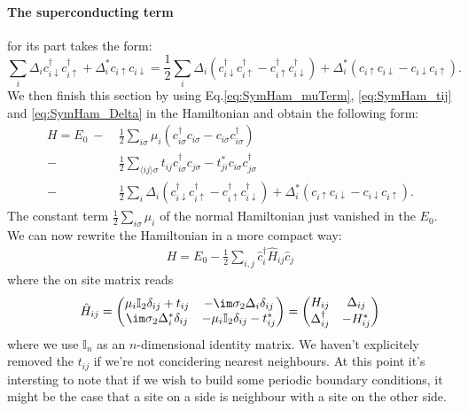 \documentclass[../main.tex]{subfile}
\begin{document}
\paragraph{The superconducting term} for its part takes the form:
\begin{equation}\label{eq:SymHam_Delta}
\sum_{i} \Delta_i c_{i\downarrow}^{\dagger}c_{i\uparrow}^{\dagger} + \Delta_i^{\ast} c_{i\uparrow}c_{i\downarrow}
        = \frac{1}{2}\sum_{i} \Delta_i \left(c_{i\downarrow}^{\dagger}c_{i\uparrow}^{\dagger}-c_{i\uparrow}^{\dagger}c_{i\downarrow}^{\dagger}\right)+ \Delta_i^{\ast} \left(c_{i\uparrow}c_{i\downarrow}-c_{i\downarrow}c_{i\uparrow}\right).
\end{equation}
We then finish this section by using Eq.\ref{eq:SymHam_muTerm}, \ref{eq:SymHam_tij} and \ref{eq:SymHam_Delta} in the Hamiltonian and obtain the following form:
\begin{equation}\label{eq:Ham_Symm_Supercond_1}
    \begin{aligned}
    H = E_0 ~-~& \frac{1}{2} \sum_{i\sigma} \mu_i\left(c_{i\sigma}^{\dagger}c_{i\sigma} - c_{i\sigma}c_{i\sigma}^{\dagger}\right)\\
    -& \frac{1}{2}\sum_{\langle ij\rangle \sigma} t_{ij}c_{i\sigma}^{\dagger}c_{j\sigma} - t_{ji}^{\ast}c_{i\sigma}c_{j\sigma}^{\dagger}\\
    -& \frac{1}{2}\sum_{i} \Delta_i \left(c_{i\downarrow}^{\dagger}c_{i\uparrow}^{\dagger}-c_{i\uparrow}^{\dagger}c_{i\downarrow}^{\dagger}\right) +
    \Delta_i^{\ast} \left(c_{i\uparrow}c_{i\downarrow}-c_{i\downarrow}c_{i\uparrow}\right).
    \end{aligned}
\end{equation}
The constant term $\frac{1}{2} \sum_{i\sigma} \mu_i$ of the normal Hamiltonian just vanished in the $E_0$. 
We can now rewrite the Hamiltonian in a more compact way:
\begin{align}
    H = E_0 - \frac{1}{2}\sum_{i,j} \hat{c}_i^{\dagger} \hat{H}_{ij} \hat{c}_j  \label{eq:BdG_sys_H}
\end{align}
where the on site matrix reads
\begin{align}
    \hat{H}_{ij} = \begin{pmatrix}
        \mu_i \mathbb{I}_2 \delta_{ij} + t_{ij} & -\im\sigma_2\Delta_i \delta_{ij}\\
        \im\sigma_2\Delta^{\ast}_i \delta_{ij} & -\mu_i \mathbb{I}_2 \delta_{ij} - t_{ij}^{\ast}
    \end{pmatrix} = \begin{pmatrix}
        H_{ij} & \Delta_{ij}\\
        \Delta_{ij}^{\dagger} & -H_{ij}^{\ast}
    \end{pmatrix}    \label{eq:H^_ij} 
\end{align}
where we use $\mathbb{I}_n$ as an $n$-dimensional identity matrix. We haven't explicitely removed the 
$t_{ij}$ if we're not concidering nearest neighbours.
At this point it's intersting to note that if we wish to build some periodic boundary conditions, 
it might be the case that a site on a side is neighbour with a site on the other side.\\  
\end{document}
